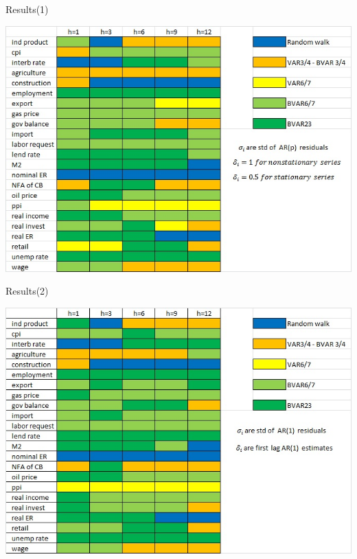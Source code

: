 \documentclass{beamer} %
\begin{document}
\begin{frame}{Results(1)}%
\vspace{-5mm}
\begin{center}
\includegraphics[scale=0.60]{hyper1.jpg}
\end{center}
\end{frame}

\begin{frame}{Results(2)} %
\vspace{-5mm}
\begin{center}
\includegraphics[scale=0.60]{hyper2.jpg}
\end{center}
\end{frame}
\end{document}
